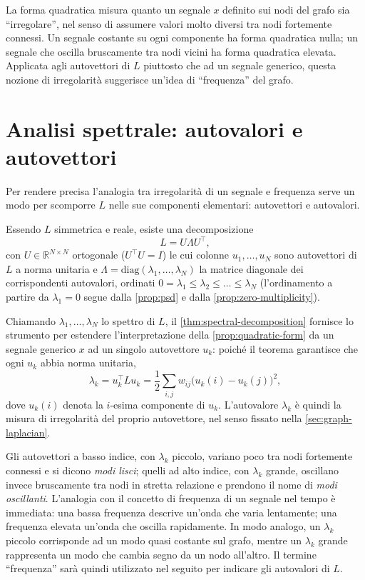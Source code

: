 La forma quadratica misura quanto un segnale $x$ definito sui nodi del grafo sia \enquote{irregolare}, nel senso di assumere valori molto diversi tra nodi fortemente connessi. Un segnale costante su ogni componente ha forma quadratica nulla; un segnale che oscilla bruscamente tra nodi vicini ha forma quadratica elevata. Applicata agli autovettori di $L$ piuttosto che ad un segnale generico, questa nozione di irregolarità suggerisce un'idea di \enquote{frequenza} del grafo.

\section{Analisi spettrale: autovalori e autovettori}
\label{sec:spectral-analysis}

Per rendere precisa l'analogia tra irregolarità di un segnale e frequenza serve un modo per scomporre $L$ nelle sue componenti elementari: autovettori e autovalori.

\begin{theorem}
\label{thm:spectral-decomposition}
Essendo $L$ simmetrica e reale, esiste una decomposizione
$$L = U\Lambda U^\top,$$
con $U \in \mathbb{R}^{N\times N}$ ortogonale ($U^\top U = I$) le cui colonne $u_1,\dots,u_N$ sono autovettori di $L$ a norma unitaria e $\Lambda = \mathrm{diag}(\lambda_1,\dots,\lambda_N)$ la matrice diagonale dei corrispondenti autovalori, ordinati $0 = \lambda_1 \leq \lambda_2 \leq \dots \leq \lambda_N$ (l'ordinamento a partire da $\lambda_1=0$ segue dalla \cref{prop:psd} e dalla \cref{prop:zero-multiplicity}).
\end{theorem}

Chiamando $\lambda_1,\dots,\lambda_N$ lo spettro di $L$, il \cref{thm:spectral-decomposition} fornisce lo strumento per estendere l'interpretazione della \cref{prop:quadratic-form} da un segnale generico $x$ ad un singolo autovettore $u_k$: poiché il teorema garantisce che ogni $u_k$ abbia norma unitaria,
$$\lambda_k = u_k^\top L u_k = \frac12\sum_{i,j}w_{ij}\big(u_k(i)-u_k(j)\big)^2,$$
dove $u_k(i)$ denota la $i$-esima componente di $u_k$. L'autovalore $\lambda_k$ è quindi la misura di irregolarità del proprio autovettore, nel senso fissato nella \cref{sec:graph-laplacian}.

Gli autovettori a basso indice, con $\lambda_k$ piccolo, variano poco tra nodi fortemente connessi e si dicono \emph{modi lisci}; quelli ad alto indice, con $\lambda_k$ grande, oscillano invece bruscamente tra nodi in stretta relazione e prendono il nome di \emph{modi oscillanti}. L'analogia con il concetto di frequenza di un segnale nel tempo è immediata: una bassa frequenza descrive un'onda che varia lentamente; una frequenza elevata un'onda che oscilla rapidamente. In modo analogo, un $\lambda_k$ piccolo corrisponde ad un modo quasi costante sul grafo, mentre un $\lambda_k$ grande rappresenta un modo che cambia segno da un nodo all'altro. Il termine \enquote{frequenza} sarà quindi utilizzato nel seguito per indicare gli autovalori di $L$.

